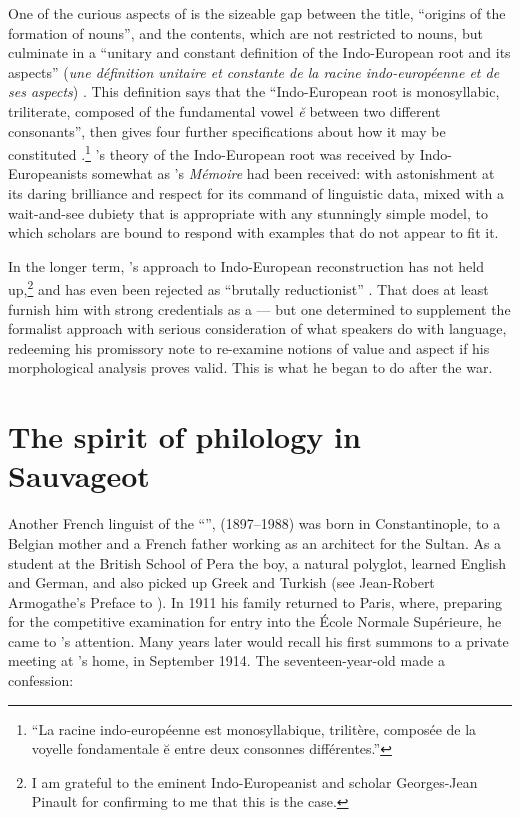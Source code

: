\documentclass[output=paper]{langscibook}
\begin{document}
One of the curious aspects of \citet{Benveniste1935} is the sizeable gap between the title, ``origins of the formation of nouns'', and the contents, which are not restricted to nouns, but culminate in a ``unitary and constant definition of the Indo-European root and its aspects'' (\emph{une définition unitaire et constante de la racine indo-européenne et de ses aspects}) \citep[170]{Benveniste1935}. This definition says that the ``Indo-European root is monosyllabic, triliterate, composed of the fundamental vowel \emph{ĕ} between two different consonants'', then gives four further specifications about how it may be constituted \citep[170--171]{Benveniste1935}.\footnote{``La racine indo-européenne est monosyllabique, trilitère, composée de la voyelle fondamentale ĕ entre deux consonnes différentes.''} {\Benveniste}'s theory of the Indo-European root was received by Indo-Europeanists somewhat as {\Saussure}'s \emph{Mémoire} had been received: with astonishment at its daring brilliance and respect for its command of linguistic data, mixed with a wait-and-see dubiety that is appropriate with any stunningly simple model, to which scholars are bound to respond with examples that do not appear to fit it.

\largerpage[1]In the longer term, {\Benveniste}'s approach to Indo-European reconstruction has not held up,\footnote{I am grateful to the eminent Indo-Europeanist and {\Benveniste} scholar Georges-Jean Pinault for confirming to me that this is the case.} and has even been rejected as ``brutally reductionist'' \citep[560]{Dunkel1981}. That does at least furnish him with strong credentials as a  — but one determined to supplement the formalist approach with serious consideration of what speakers do with language, redeeming his \citeyear{Benveniste1935} promissory note to re-examine notions of value and aspect if his morphological analysis proves valid. This is what he began to do after the war.

\section{The spirit of philology in Sauvageot}
\label{sec:joseph:sauvageot}

Another French linguist of the ``'', {} {\Sauvageot} (1897--1988) was born in Constantinople, to a Belgian mother and a French father working as an architect for the Sultan. As a student at the British School of Pera the boy, a natural polyglot, learned English and German, and also picked up Greek and Turkish (see Jean-Robert Armogathe's Preface to \citealt[9]{Sauvageot2013}). In 1911 his family returned to Paris, where, preparing for the competitive examination for entry into the École Normale Supérieure, he came to {\Meillet}'s attention. Many years later {\Sauvageot} would recall his first summons to a private meeting at {\Meillet}'s home, in September 1914. The seventeen-year-old made a confession:
\end{document}
